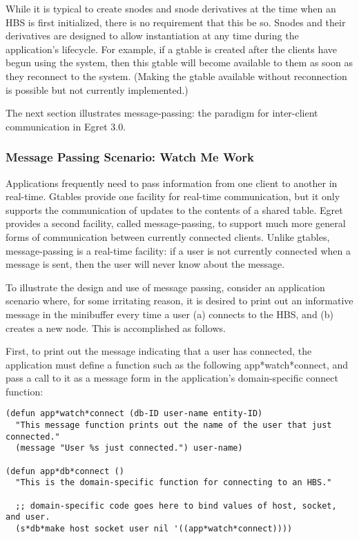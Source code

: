 While it is typical to create snodes and snode derivatives at the time when
an HBS is first initialized, there is no requirement that this be so.
Snodes and their derivatives are designed to allow instantiation at any
time during the application's lifecycle.  For example, if a gtable is
created after the clients have begun using the system, then this gtable
will become available to them as soon as they reconnect to the system.
(Making the gtable available without reconnection is possible but not
currently implemented.) 

The next section illustrates message-passing: the paradigm for inter-client
communication in Egret 3.0. 

\subsubsection*{Message Passing Scenario: Watch Me Work}

Applications frequently need to pass information from one client to another
in real-time.  Gtables provide one facility for real-time communication,
but it only supports the communication of updates to the contents of a
shared table.  Egret provides a second facility, called message-passing, to
support much more general forms of communication between currently
connected clients.  Unlike gtables, message-passing is a real-time
facility: if a user is not currently connected when a message is sent, then
the user will never know about the message.

To illustrate the design and use of message passing, consider an application
scenario where, for some irritating reason, it is desired to print out an
informative message in the minibuffer every time a user (a) connects to the HBS,
and (b) creates a new node. This is accomplished as follows.

First, to print out the message indicating that a user has connected, the
application must define a function such as the following app*watch*connect,
and pass a call to it as a message form in the application's
domain-specific connect function:

\small\begin{verbatim}
(defun app*watch*connect (db-ID user-name entity-ID)
  "This message function prints out the name of the user that just connected."
  (message "User %s just connected.") user-name)

(defun app*db*connect ()
  "This is the domain-specific function for connecting to an HBS."

  ;; domain-specific code goes here to bind values of host, socket, and user.
  (s*db*make host socket user nil '((app*watch*connect))))

\end{verbatim}\normalsize

